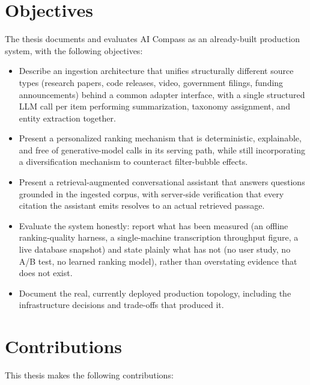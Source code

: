 \section{Objectives}

The thesis documents and evaluates AI Compass as an already-built production system, with the following objectives:

\begin{itemize}
  \item Describe an ingestion architecture that unifies structurally different source types (research papers, code releases, video, government filings, funding announcements) behind a common adapter interface, with a single structured LLM call per item performing summarization, taxonomy assignment, and entity extraction together.
  \item Present a personalized ranking mechanism that is deterministic, explainable, and free of generative-model calls in its serving path, while still incorporating a diversification mechanism to counteract filter-bubble effects.
  \item Present a retrieval-augmented conversational assistant that answers questions grounded in the ingested corpus, with server-side verification that every citation the assistant emits resolves to an actual retrieved passage.
  \item Evaluate the system honestly: report what has been measured (an offline ranking-quality harness, a single-machine transcription throughput figure, a live database snapshot) and state plainly what has not (no user study, no A/B test, no learned ranking model), rather than overstating evidence that does not exist.
  \item Document the real, currently deployed production topology, including the infrastructure decisions and trade-offs that produced it.
\end{itemize}

\section{Contributions}

This thesis makes the following contributions:

